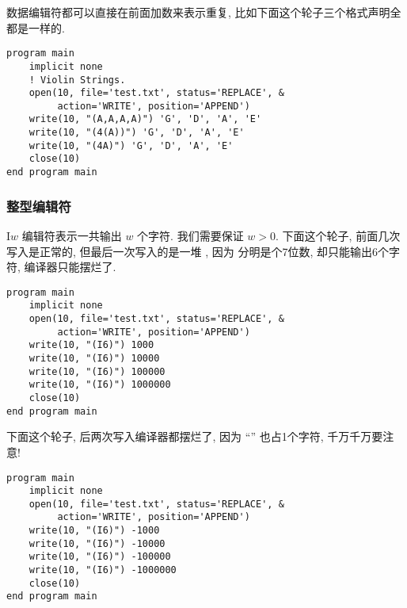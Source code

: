 数据编辑符都可以直接在前面加数来表示重复, 比如下面这个轮子三个格式声明全都是一样的. 
\begin{lstlisting}
program main
    implicit none
    ! Violin Strings. 
    open(10, file='test.txt', status='REPLACE', &
         action='WRITE', position='APPEND')
    write(10, "(A,A,A,A)") 'G', 'D', 'A', 'E'
    write(10, "(4(A))") 'G', 'D', 'A', 'E'
    write(10, "(4A)") 'G', 'D', 'A', 'E'
    close(10)
end program main
\end{lstlisting}

\subsubsection{整型编辑符}

I$ w $ 编辑符表示一共输出 $ w $ 个字符. 我们需要保证 $ w>0 $. 下面这个轮子, 前面几次写入是正常的, 但最后一次写入的是一堆 \ttt{*}, 因为  分明是个7位数, 却只能输出6个字符, 编译器只能摆烂了. 
\begin{lstlisting}
program main
    implicit none
    open(10, file='test.txt', status='REPLACE', &
         action='WRITE', position='APPEND')
    write(10, "(I6)") 1000
    write(10, "(I6)") 10000
    write(10, "(I6)") 100000
    write(10, "(I6)") 1000000
    close(10)
end program main
\end{lstlisting}
下面这个轮子, 后两次写入编译器都摆烂了, 因为 ``\ttt{-}'' 也占1个字符, 千万千万要注意!
\begin{lstlisting}
program main
    implicit none
    open(10, file='test.txt', status='REPLACE', &
         action='WRITE', position='APPEND')
    write(10, "(I6)") -1000
    write(10, "(I6)") -10000
    write(10, "(I6)") -100000
    write(10, "(I6)") -1000000
    close(10)
end program main
\end{lstlisting}

